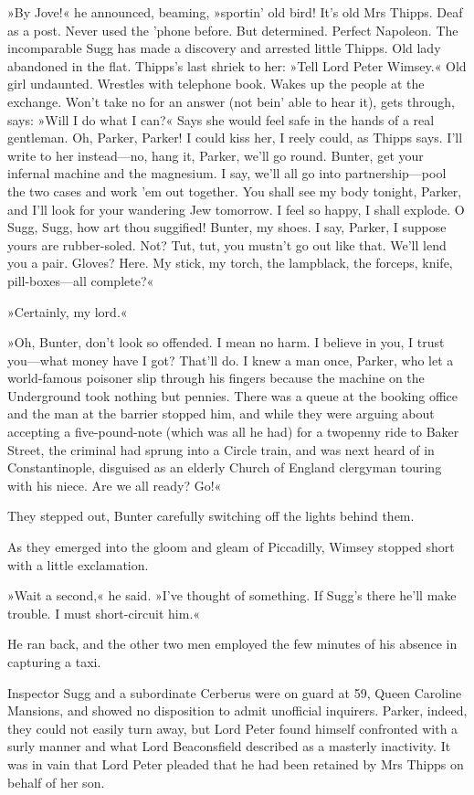 »By Jove!« he announced, beaming, »sportin' old bird! It's old Mrs Thipps. Deaf as a post. Never used the 'phone before. But determined. Perfect Napoleon. The incomparable Sugg has made a discovery and arrested little Thipps. Old lady abandoned in the flat. Thipps's last shriek to her: »Tell Lord Peter Wimsey.« Old girl undaunted. Wrestles with telephone book. Wakes up the people at the exchange. Won't take no for an answer (not bein' able to hear it), gets through, says: »Will I do what I can?« Says she would feel safe in the hands of a real gentleman. Oh, Parker, Parker! I could kiss her, I reely could, as Thipps says. I'll write to her instead—no, hang it, Parker, we'll go round. Bunter, get your infernal machine and the magnesium. I say, we'll all go into partnership—pool the two cases and work 'em out together. You shall see my body tonight, Parker, and I'll look for your wandering Jew tomorrow. I feel so happy, I shall explode. O Sugg, Sugg, how art thou suggified! Bunter, my shoes. I say, Parker, I suppose yours are rubber-soled. Not? Tut, tut, you mustn't go out like that. We'll lend you a pair. Gloves? Here. My stick, my torch, the lampblack, the forceps, knife, pill-boxes—all complete?«

»Certainly, my lord.«

»Oh, Bunter, don't look so offended. I mean no harm. I believe in you, I trust you—what money have I got? That'll do. I knew a man once, Parker, who let a world-famous poisoner slip through his fingers because the machine on the Underground took nothing but pennies. There was a queue at the booking office and the man at the barrier stopped him, and while they were arguing about accepting a five-pound-note (which was all he had) for a twopenny ride to Baker Street, the criminal had sprung into a Circle train, and was next heard of in Constantinople, disguised as an elderly Church of England clergyman touring with his niece. Are we all ready? Go!«

They stepped out, Bunter carefully switching off the lights behind them.

As they emerged into the gloom and gleam of Piccadilly, Wimsey stopped short with a little exclamation.

»Wait a second,« he said. »I've thought of something. If Sugg's there he'll make trouble. I must short-circuit him.«

He ran back, and the other two men employed the few minutes of his absence in capturing a taxi.

Inspector Sugg and a subordinate Cerberus were on guard at 59, Queen Caroline Mansions, and showed no disposition to admit unofficial inquirers. Parker, indeed, they could not easily turn away, but Lord Peter found himself confronted with a surly manner and what Lord Beaconsfield described as a masterly inactivity. It was in vain that Lord Peter pleaded that he had been retained by Mrs Thipps on behalf of her son.

